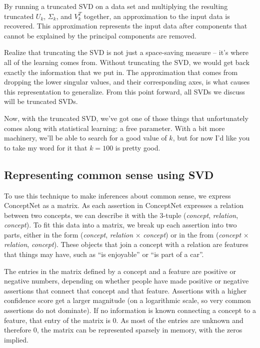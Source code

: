\documentclass[11pt]{article}
\begin{document}
By running a truncated SVD on a data set and multiplying the resulting
truncated $U_k$, $\Sigma_k$, and $V^T_k$ together, an approximation to the
input data is recovered. This approximation represents the input data after
components that cannot be explained by the principal components are removed.

Realize that truncating the SVD is not just a space-saving measure -- it's
where all of the learning comes from. Without truncating the SVD, we would get
back exactly the information that we put in. The approximation that comes from
dropping the lower singular values, and their corresponding axes, is what
causes this representation to generalize.  From this point forward, all SVDs we
discuss will be truncated SVDs.  

Now, with the truncated SVD, we've got one of those things that unfortunately
comes along with statistical learning: a free parameter. With a bit more
machinery, we'll be able to search for a good value of $k$, but for now I'd
like you to take my word for it that $k=100$ is pretty good.

\subsection{Representing common sense using SVD}

To use this technique to make inferences about common sense, we express
ConceptNet as a matrix. As each assertion in ConceptNet expresses a relation
between two concepts, we can describe it with the 3-tuple ({\em concept}, {\em
relation}, {\em concept}). To fit this data into a matrix, we break up each
assertion into two parts, either in the form ({\em concept}, {\em relation}
$\times$ {\em concept}) or in the from ({\em concept} $\times$ {\em relation},
{\em concept}). These objects that join a concept with a relation are features
that things may have, such as ``is enjoyable'' or ``is part of a car''.

The entries in the matrix defined by a concept and a feature are positive or
negative numbers, depending on whether people have made positive or negative
assertions that connect that concept and that feature. Assertions with a higher
confidence score get a larger magnitude (on a logarithmic scale, so very common
assertions do not dominate). If no information is known connecting a concept to
a feature, that entry of the matrix is 0. As most of the entries are unknown
and therefore 0, the matrix can be represented sparsely in memory, with the
zeros implied.
\end{document}
